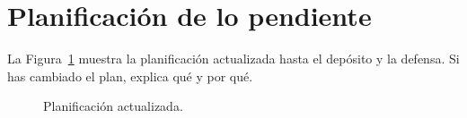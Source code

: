 \documentclass[12pt,a4paper]{article}
\begin{document}
\section{Planificación de lo pendiente}
La Figura~\ref{fig:plan-seguimiento} muestra la planificación actualizada hasta
el depósito y la defensa. Si has cambiado el plan, explica qué y por qué.

\begin{figure}[htbp]
  \centering
  
  \caption{Planificación actualizada.}
  \label{fig:plan-seguimiento}
\end{figure}
\end{document}
